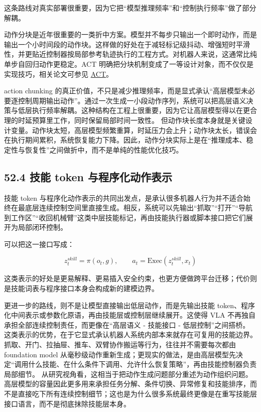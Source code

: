 这条路线对真实部署很重要，因为它把“模型推理频率”和“控制执行频率”做了部分解耦。

动作分块是近年很重要的一类折中方案。模型并不每步只输出一个即时动作，而是输出一个小时间段的动作块。这样做的好处在于减轻标记级抖动、增强短时平滑性，并更贴近控制器按局部参考轨迹执行的工程方式。对机器人来说，这通常比纯单步自回归动作更稳定。ACT 明确把分块机制变成了一等设计对象，而不仅仅是实现技巧，相关论文可参见 \href{https://arxiv.org/abs/2304.13705}{ACT}。

action chunking 的真正价值，不只是减少推理频率，而是显式承认“高层模型未必要逐控制周期输出动作”。通过一次生成一小段动作序列，系统可以把高层语义决策与低层执行频率解耦。这种结构在工程上很重要，因为它让高层模型得以在更合理的时延预算里工作，同时保留局部时间一致性。 但动作块长度本身就是关键设计变量。动作块太短，高层模型频繁重算，时延压力会上升；动作块太长，错误会在执行期间累积，系统恢复能力下降。因此，动作分块实际上是在“推理成本、稳定性与恢复性”之间做折中，而不是单纯的性能优化技巧。

\subsection*{52.4 技能 token 与程序化动作表示}


技能 token 与程序化动作表示的共同出发点，是承认很多机器人行为并不适合始终在最底层连续控制空间里直接生成。相反，系统可以先输出“抓取”“打开”“导航到工作区”“收回机械臂”这类中层技能标记，再由技能执行器或脚本接口把它们展开为局部闭环控制。

可以把这一接口写成：

\begingroup
\footnotesize
\begin{equation*}
z_t^{skill} = \pi(o_t, g), \qquad a_t = \mathrm{Exec}(z_t^{skill}, x_t)
\end{equation*}
\endgroup

这类表示的好处是更易解释、更易插入安全约束，也更方便做跨平台迁移；代价则是技能词表与程序接口本身会构成新的建模边界。

更进一步的路线，则不是让模型直接输出低层动作，而是先输出技能 token、程序化中间表示或参数化原语，再由技能层或控制层继续展开。这使得 VLA 不再独自承担全部连续控制责任，而更像在“高层语义 - 技能接口 - 低层控制”之间搭桥。 这类表示的优势，在于它显式承认机器人系统内部本来就存在可复用的技能边界。抓取、开门、拉抽屉、推车、双臂协作搬运等行为，往往并不需要每次都由 foundation model 从毫秒级动作重新生成；更现实的做法，是由高层模型先决定“调用什么技能、在什么条件下调用、允许什么恢复策略”，再由技能控制器负责局部细节。 从研究视角看，这相当于把动作生成问题部分重述为动作组织问题。高层模型的容量因此更多用来承担任务分解、条件切换、异常修复和技能排序，而不是直接吃下所有连续控制细节；这也是为什么很多系统最终更像是在重写技能层接口语言，而不是彻底抹除技能层本身。


